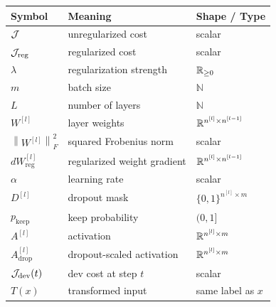 \begin{center}
\begin{tabular}{lll}
\toprule
Symbol & Meaning & Shape / Type \\
\midrule
$\mathcal{J}$ & unregularized cost & scalar \\
$\mathcal{J}_{\mathrm{reg}}$ & regularized cost & scalar \\
$\lambda$ & regularization strength & $\mathbb{R}_{\ge 0}$ \\
$m$ & batch size & $\mathbb{N}$ \\
$L$ & number of layers & $\mathbb{N}$ \\
$W^{[l]}$ & layer weights & $\mathbb{R}^{n^{[l]} \times n^{[l-1]}}$ \\
$\left\lVert W^{[l]} \right\rVert_F^2$ & squared Frobenius norm & scalar \\
$dW_{\mathrm{reg}}^{[l]}$ & regularized weight gradient & $\mathbb{R}^{n^{[l]} \times n^{[l-1]}}$ \\
$\alpha$ & learning rate & scalar \\
$D^{[l]}$ & dropout mask & $\{0,1\}^{n^{[l]} \times m}$ \\
$p_{\mathrm{keep}}$ & keep probability & $(0,1]$ \\
$A^{[l]}$ & activation & $\mathbb{R}^{n^{[l]} \times m}$ \\
$A_{\mathrm{drop}}^{[l]}$ & dropout-scaled activation & $\mathbb{R}^{n^{[l]} \times m}$ \\
$\mathcal{J}_{\mathrm{dev}}(t)$ & dev cost at step $t$ & scalar \\
$T(x)$ & transformed input & same label as $x$ \\
\bottomrule
\end{tabular}
\end{center}
